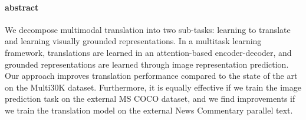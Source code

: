 \paragraph{abstract}

We decompose multimodal translation into two sub-tasks: learning to translate and learning visually grounded representations. In a multitask learning framework, translations are learned in an attention-based encoder-decoder, and grounded representations are learned through image representation prediction. Our approach improves translation performance compared to the state of the art on the Multi30K dataset. Furthermore, it is equally effective if we train the image prediction task on the external MS COCO dataset, and we find improvements if we train the translation model on the external News Commentary parallel text.

